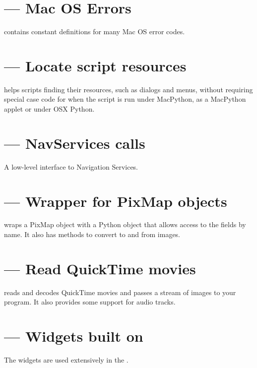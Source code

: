 \section{ --- Mac OS Errors}

 contains constant definitions for many Mac OS error
codes.


\section{ --- Locate script resources}

 helps scripts finding their resources, such as
dialogs and menus, without requiring special case code for when the
script is run under MacPython, as a MacPython applet or under OSX Python.

\section{ --- NavServices calls}

A low-level interface to Navigation Services. 

\section{ --- Wrapper for PixMap objects}

 wraps a PixMap object with a Python object that
allows access to the fields by name. It also has methods to convert
to and from  images.

\section{ --- Read QuickTime movies}

 reads and decodes QuickTime movies and passes
a stream of images to your program. It also provides some support for
audio tracks.

\section{ --- Widgets built on }

The  widgets are used extensively in the .

